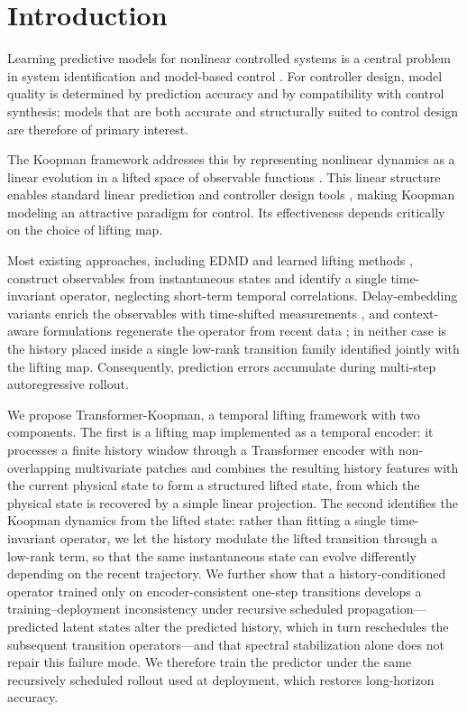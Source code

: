 \section{Introduction}
\label{sec:introduction}

Learning predictive models for nonlinear controlled systems is a central problem in system identification and model-based control \cite{ljung1999system, vanoverschee1994n4sid, nelles2020nonlinear}. For controller design, model quality is determined by prediction accuracy and by compatibility with control synthesis; models that are both accurate and structurally suited to control design are therefore of primary interest.

The Koopman framework addresses this by representing nonlinear dynamics as a linear evolution in a lifted space of observable functions \cite{koopman1931hamiltonian, brunton2022modern}. This linear structure enables standard linear prediction and controller design tools \cite{otto2021koopman, korda2018linear}, making Koopman modeling an attractive paradigm for control. Its effectiveness depends critically on the choice of lifting map.

Most existing approaches, including EDMD \cite{williams2015data} and learned lifting methods \cite{lusch2018deep, takeishi2017koopman}, construct observables from instantaneous states and identify a single time-invariant operator, neglecting short-term temporal correlations. Delay-embedding variants enrich the observables with time-shifted measurements \cite{kamb2020timedelay, brunton2017chaos}, and context-aware formulations regenerate the operator from recent data \cite{liu2023koopa, li2025mamko}; in neither case is the history placed inside a single low-rank transition family identified jointly with the lifting map. Consequently, prediction errors accumulate during multi-step autoregressive rollout.

We propose Transformer-Koopman, a temporal lifting framework with two components. The first is a lifting map implemented as a temporal encoder: it processes a finite history window through a Transformer encoder with non-overlapping multivariate patches and combines the resulting history features with the current physical state to form a structured lifted state, from which the physical state is recovered by a simple linear projection. The second identifies the Koopman dynamics from the lifted state: rather than fitting a single time-invariant operator, we let the history modulate the lifted transition through a low-rank term, so that the same instantaneous state can evolve differently depending on the recent trajectory. We further show that a history-conditioned operator trained only on encoder-consistent one-step transitions develops a training--deployment inconsistency under recursive scheduled propagation---predicted latent states alter the predicted history, which in turn reschedules the subsequent transition operators---and that spectral stabilization alone does not repair this failure mode. We therefore train the predictor under the same recursively scheduled rollout used at deployment, which restores long-horizon accuracy.

